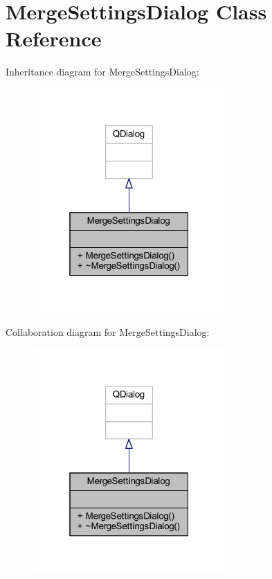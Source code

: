 \hypertarget{class_merge_settings_dialog}{}\section{Merge\+Settings\+Dialog Class Reference}
\label{class_merge_settings_dialog}


Inheritance diagram for Merge\+Settings\+Dialog\+:
\nopagebreak
\begin{figure}[H]
\begin{center}
\leavevmode
\includegraphics[width=208pt]{class_merge_settings_dialog__inherit__graph}
\end{center}
\end{figure}


Collaboration diagram for Merge\+Settings\+Dialog\+:
\nopagebreak
\begin{figure}[H]
\begin{center}
\leavevmode
\includegraphics[width=208pt]{class_merge_settings_dialog__coll__graph}
\end{center}
\end{figure}
